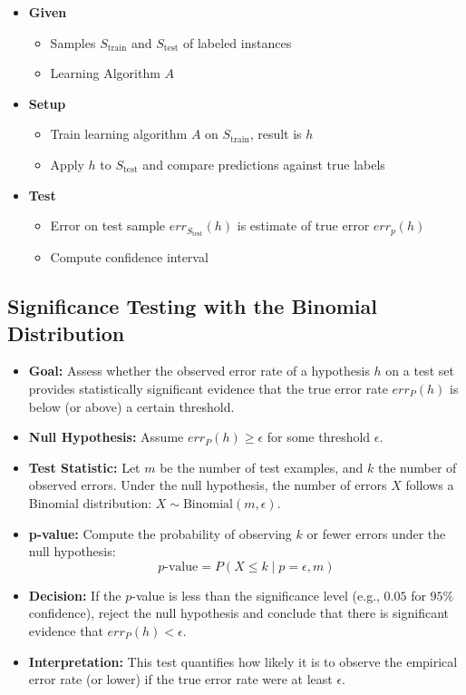 \begin{itemize}
    \item \textbf{Given}
    \begin{itemize}
        \item Samples $S_{\text{train}}$ and $S_{\text{test}}$ of labeled instances
        \item Learning Algorithm $A$
    \end{itemize}
    \item \textbf{Setup}
    \begin{itemize}
        \item Train learning algorithm $A$ on $S_{\text{train}}$, result is $h$
        \item Apply $h$ to $S_{\text{test}}$ and compare predictions against true labels
    \end{itemize}
    \item \textbf{Test}
    \begin{itemize}
        \item Error on test sample $err_{S_{\text{test}}}(h)$ is estimate of true error $err_{p}(h)$
        \item Compute confidence interval
    \end{itemize}
\end{itemize}

\subsection{Significance Testing with the Binomial Distribution}

\begin{itemize}
    \item \textbf{Goal:} Assess whether the observed error rate of a hypothesis $h$ on a test set provides statistically significant evidence that the true error rate $err_P(h)$ is below (or above) a certain threshold.
    \item \textbf{Null Hypothesis:} Assume $err_P(h) \geq \epsilon$ for some threshold $\epsilon$.
    \item \textbf{Test Statistic:} Let $m$ be the number of test examples, and $k$ the number of observed errors. Under the null hypothesis, the number of errors $X$ follows a Binomial distribution: $X \sim \text{Binomial}(m, \epsilon)$.
    \item \textbf{p-value:} Compute the probability of observing $k$ or fewer errors under the null hypothesis:
    \[
        p\text{-value} = P(X \leq k \mid p = \epsilon, m)
    \]
    \item \textbf{Decision:} If the $p$-value is less than the significance level (e.g., $0.05$ for $95\%$ confidence), reject the null hypothesis and conclude that there is significant evidence that $err_P(h) < \epsilon$.
    \item \textbf{Interpretation:} This test quantifies how likely it is to observe the empirical error rate (or lower) if the true error rate were at least $\epsilon$.
\end{itemize}


